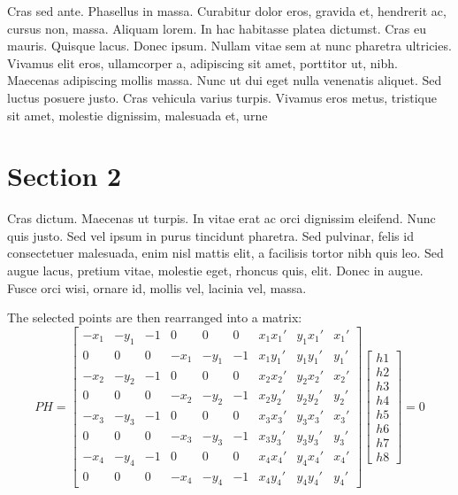 Cras sed ante. Phasellus in massa. Curabitur dolor eros, gravida et, hendrerit ac, cursus non, massa. Aliquam lorem. In hac habitasse platea dictumst. Cras eu mauris. Quisque lacus. Donec ipsum. Nullam vitae sem at nunc pharetra ultricies. Vivamus elit eros, ullamcorper a, adipiscing sit amet, porttitor ut, nibh. Maecenas adipiscing mollis massa. Nunc ut dui eget nulla venenatis aliquet. Sed luctus posuere justo. Cras vehicula varius turpis. Vivamus eros metus, tristique sit amet, molestie dignissim, malesuada et, urne \cite{hinton2006fast}

\section{Section 2}
Cras dictum. Maecenas ut turpis. In vitae erat ac orci dignissim eleifend. Nunc quis justo. Sed vel ipsum in purus tincidunt pharetra. Sed pulvinar, felis id consectetuer malesuada, enim nisl mattis elit, a facilisis tortor nibh quis leo. Sed augue lacus, pretium vitae, molestie eget, rhoncus quis, elit. Donec in augue. Fusce orci wisi, ornare id, mollis vel, lacinia vel, massa.

The selected points are then rearranged into a matrix:
\[
PH = \begin{bmatrix}
-x_1 & -y_1 & -1 & 0 & 0 & 0 & x_1 x_1' & y_1 x_1' & x_1' \\
0 & 0 & 0 & -x_1 & -y_1 & -1 & x_1 y_1' & y_1 y_1' & y_1' \\
-x_2 & -y_2 & -1 & 0 & 0 & 0 & x_2 x_2' & y_2 x_2' & x_2' \\
0 & 0 & 0 & -x_2 & -y_2 & -1 & x_2 y_2' & y_2 y_2' & y_2' \\
-x_3 & -y_3 & -1 & 0 & 0 & 0 & x_3 x_3' & y_3 x_3' & x_3' \\
0 & 0 & 0 & -x_3 & -y_3 & -1 & x_3 y_3' & y_3 y_3' & y_3' \\
-x_4 & -y_4 & -1 & 0 & 0 & 0 & x_4 x_4' & y_4 x_4' & x_4' \\
0 & 0 & 0 & -x_4 & -y_4 & -1 & x_4 y_4' & y_4 y_4' & y_4' 
\end{bmatrix}
\begin{bmatrix}
h1 \\ h2 \\ h3 \\ h4 \\ h5 \\ h6 \\ h7 \\ h8
\end{bmatrix} = 0
\]

